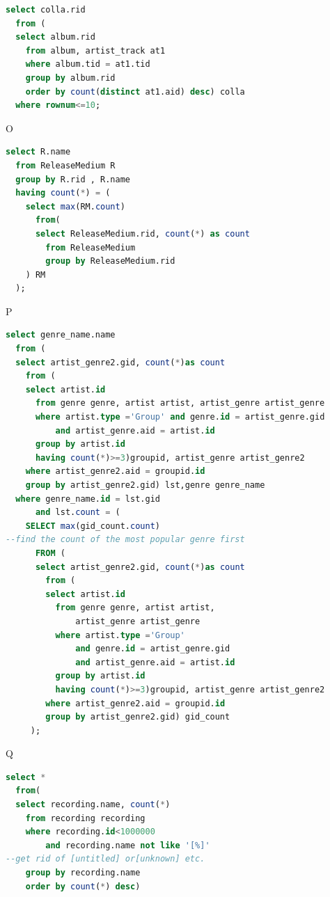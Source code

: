 \documentclass[11pt]{article} %
\begin{document}
{\begin{lstlisting}[language=SQL, keywordstyle=\color{blue!70},
commentstyle=\color{red!50!green!50!blue!50},
rulesepcolor=\color{red!20!green!20!blue!20},
frame=shadowbox]
select colla.rid
  from (
  select album.rid
    from album, artist_track at1
    where album.tid = at1.tid
    group by album.rid
    order by count(distinct at1.aid) desc) colla
  where rownum<=10;
\end{lstlisting}
O
\begin{lstlisting}[language=SQL, keywordstyle=\color{blue!70},
commentstyle=\color{red!50!green!50!blue!50},
rulesepcolor=\color{red!20!green!20!blue!20},
frame=shadowbox]
select R.name
  from ReleaseMedium R
  group by R.rid , R.name
  having count(*) = (
    select max(RM.count)
      from(
      select ReleaseMedium.rid, count(*) as count
        from ReleaseMedium
        group by ReleaseMedium.rid
    ) RM
  );
\end{lstlisting}
P
\begin{lstlisting}[language=SQL, keywordstyle=\color{blue!70},
commentstyle=\color{red!50!green!50!blue!50},
rulesepcolor=\color{red!20!green!20!blue!20},
frame=shadowbox]
select genre_name.name
  from (
  select artist_genre2.gid, count(*)as count
    from (
    select artist.id
      from genre genre, artist artist, artist_genre artist_genre
      where artist.type ='Group' and genre.id = artist_genre.gid
          and artist_genre.aid = artist.id
      group by artist.id
      having count(*)>=3)groupid, artist_genre artist_genre2
    where artist_genre2.aid = groupid.id
    group by artist_genre2.gid) lst,genre genre_name
  where genre_name.id = lst.gid
      and lst.count = (
    SELECT max(gid_count.count)
--find the count of the most popular genre first
      FROM (
      select artist_genre2.gid, count(*)as count
        from (
        select artist.id
          from genre genre, artist artist,
              artist_genre artist_genre
          where artist.type ='Group'
              and genre.id = artist_genre.gid
              and artist_genre.aid = artist.id
          group by artist.id
          having count(*)>=3)groupid, artist_genre artist_genre2
        where artist_genre2.aid = groupid.id
        group by artist_genre2.gid) gid_count
     );
\end{lstlisting}
Q
\begin{lstlisting}[language=SQL, keywordstyle=\color{blue!70},
commentstyle=\color{red!50!green!50!blue!50},
rulesepcolor=\color{red!20!green!20!blue!20},
frame=shadowbox]
select *
  from(
  select recording.name, count(*)
    from recording recording
    where recording.id<1000000
        and recording.name not like '[%]'
--get rid of [untitled] or[unknown] etc.
    group by recording.name
    order by count(*) desc)

\end{lstlisting}}
\end{document}
